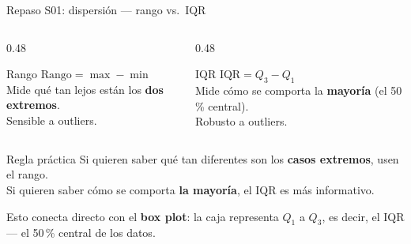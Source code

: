 \documentclass[aspectratio=169, 11pt]{beamer}
\begin{document}
\begin{frame}{Repaso S01: dispersi\'on --- rango vs.\ IQR}
\begin{columns}[T]
\begin{column}{0.48\textwidth}
\begin{block}{Rango}
$\text{Rango} = \max - \min$\\[4pt]
Mide qu\'e tan lejos est\'an los \textbf{dos extremos}.\\[4pt]
Sensible a outliers.
\end{block}
\end{column}
\begin{column}{0.48\textwidth}
\begin{block}{IQR}
$\text{IQR} = Q_3 - Q_1$\\[4pt]
Mide c\'omo se comporta la \textbf{mayor\'ia} (el 50\,\% central).\\[4pt]
Robusto a outliers.
\end{block}
\end{column}
\end{columns}

\vspace{0.5em}
\begin{exampleblock}{Regla pr\'actica}
Si quieren saber qu\'e tan diferentes son los \textbf{casos extremos}, usen el rango.\\
Si quieren saber c\'omo se comporta \textbf{la mayor\'ia}, el IQR es m\'as informativo.
\end{exampleblock}

\vspace{0.3em}
\alert{Esto conecta directo con el \textbf{box plot}: la caja representa $Q_1$ a $Q_3$, es decir, el IQR --- el 50\,\% central de los datos.}
\end{frame}
\end{document}

